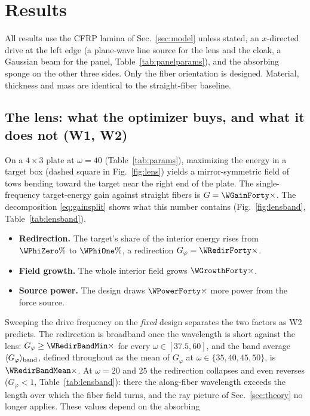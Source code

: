 \section{Results}\label{sec:results}
All results use the CFRP lamina of Sec.~\ref{sec:model} unless stated, an $x$-directed drive
at the left edge (a plane-wave line source for the lens and the cloak, a Gaussian beam for
the panel, Table~\ref{tab:panelparams}), and the absorbing sponge on the other three
sides. Only the
fiber orientation is designed. Material, thickness and mass are identical to the
straight-fiber baseline.

\subsection{The lens: what the optimizer buys, and what it does not (W1, W2)}\label{sec:lens}
On a $4\times3$ plate at $\omega=40$ (Table~\ref{tab:params}), maximizing the energy in
a target box (dashed square in Fig.~\ref{fig:lens}) yields a mirror-symmetric field of
tows bending toward the target near the right end of the plate. The single-frequency target-energy gain against straight
fibers is $G=\WGainForty\times$. The decomposition \eqref{eq:gainsplit} shows what this
number contains (Fig.~\ref{fig:lensband}, Table~\ref{tab:lensband}).
\begin{itemize}[itemsep=1pt]
\item \textbf{Redirection.} The target's share of the interior energy rises from
  $\WPhiZero\%$ to $\WPhiOne\%$, a redirection $G_\varphi=\WRedirForty\times$.
\item \textbf{Field growth.} The whole interior field grows $\WGrowthForty\times$.
\item \textbf{Source power.} The design draws $\WPowerForty\times$ more power from the
  force source.
\end{itemize}
Sweeping the drive frequency on the \emph{fixed} design separates the two factors as W2
predicts. The redirection is broadband once the wavelength is short against the lens:
$G_\varphi\ge\WRedirBandMin\times$ for every $\omega\in[37.5,60]$, and the band average
$\langle G_\varphi\rangle_{\rm band}$, defined throughout as the mean of $G_\varphi$ at
$\omega\in\{35,40,45,50\}$, is $\WRedirBandMean\times$. At $\omega=20$ and $25$ the redirection
collapses and even reverses ($G_\varphi<1$, Table~\ref{tab:lensband}): there the
along-fiber wavelength exceeds the length over which the fiber field turns, and the ray
picture of Sec.~\ref{sec:theory} no longer applies. These values depend on the absorbing

